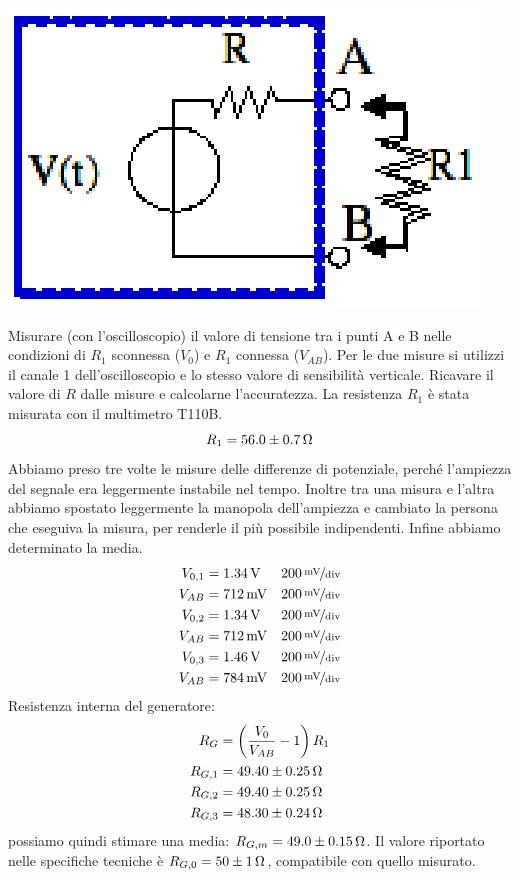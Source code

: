 \documentclass[italian,a4paper]{article}
\begin{document}
\begin{center}
 \includegraphics[height=5\baselineskip]{circuito1.eps}
\end{center}
Misurare (con l’oscilloscopio) il valore di tensione tra i punti A e B nelle condizioni di $R_1$ sconnessa
($V_0$) e $R_1$ connessa ($V_{AB}$). Per le due misure si utilizzi il canale 1 dell’oscilloscopio e lo stesso
valore di sensibilità verticale. Ricavare il valore di $R$ dalle misure e calcolarne l’accuratezza. 
La resistenza $R_1$ è stata misurata con il multimetro T110B.
\begin{equation*}
  R_1=\unit[56.0 \pm 0.7]{\ohm}
\end{equation*}
Abbiamo preso tre volte le misure delle differenze di potenziale, perché
l'ampiezza del segnale era leggermente instabile nel tempo. Inoltre tra una
misura e l'altra abbiamo spostato leggermente la manopola dell'ampiezza e
cambiato la persona che eseguiva la misura, per renderle il più possibile
indipendenti. Infine abbiamo determinato la media.
\begin{align*}
V_{0,1}&=\unit[1.34]{V} &\unitfrac[200]{mV}{div}\\
V_{AB}&=\unit[712]{mV}& \unitfrac[200]{mV}{div}\\
V_{0,2}&=\unit[1.34]{V} & \unitfrac[200]{mV}{div}\\
V_{AB}&=\unit[712]{mV}& \unitfrac[200]{mV}{div}\\
V_{0,3}&=\unit[1.46]{V} & \unitfrac[200]{mV}{div}\\
V_{AB}&=\unit[784]{mV}& \unitfrac[200]{mV}{div}
\end{align*}
Resistenza interna del generatore:
\begin{align*}
R_G&=\left(\dfrac{V_0}{V_{AB}}-1 \right)R_1 \\
R_{G,1} &= \unit[49.40 \pm 0.25]{\ohm} \\
R_{G,2} &= \unit[49.40 \pm 0.25]{\ohm} \\
R_{G,3} &= \unit[48.30 \pm 0.24]{\ohm} \\
\end{align*}
possiamo quindi stimare una media: $R_{G,m}=\unit[49.0 \pm 0.15]{\ohm}$. Il
valore riportato nelle specifiche tecniche è $R_{G,0} = \unit[50 \pm
1]{\ohm}$, compatibile con quello misurato.
\end{document}
